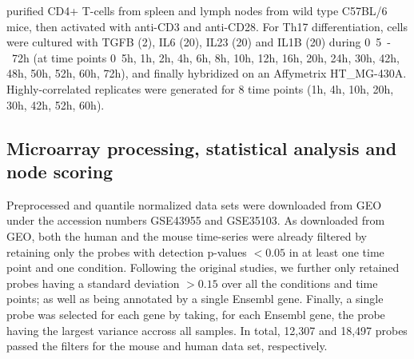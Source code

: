 \textcite{yosef2013dynamic} purified CD4+ T-cells from spleen and lymph nodes from wild type C57BL/6 mice, then activated with anti-CD3 and anti-CD28. For Th17 differentiation, cells were cultured with TGFB (\unit{2}{\nano\gram\per\milli\liter}), IL6 (\unit{20}{\nano\gram\per\milli\liter}), IL23 (\unit{20}{\nano\gram\per\milli\liter}) and IL1B (\unit{20}{\nano\gram\per\milli\liter}) during \unit{0.5-72}{h} (at time points \unit{0.5}{h}, \unit{1}{h}, \unit{2}{h}, \unit{4}{h}, \unit{6}{h}, \unit{8}{h}, \unit{10}{h}, \unit{12}{h}, \unit{16}{h}, \unit{20}{h}, \unit{24}{h}, \unit{30}{h}, \unit{42}{h}, \unit{48}{h}, \unit{50}{h}, \unit{52}{h}, \unit{60}{h}, \unit{72}{h}), and finally hybridized on an Affymetrix HT\_MG-430A.
Highly-correlated replicates were generated for 8 time points (\unit{1}{h}, \unit{4}{h}, \unit{10}{h}, \unit{20}{h}, \unit{30}{h}, \unit{42}{h}, \unit{52}{h}, \unit{60}{h}).


\subsection{Microarray processing, statistical analysis and node scoring}
\label{sub:statistical_analysis_and_node_scoring}



Preprocessed and quantile normalized data sets were downloaded from GEO under the accession numbers GSE43955 and GSE35103.
As downloaded from GEO, both the human and the mouse time-series were already filtered by retaining only the probes with detection p-values $< 0.05$ in at least one time point and one condition.
Following the original studies, we further only retained probes having a standard deviation $> 0.15$ over all the conditions and time points; as well as being annotated by a single Ensembl gene.
Finally, a single probe was selected for each gene by taking, for each Ensembl gene, the probe having the largest variance accross all samples.
In total, 12,307 and 18,497 probes passed the filters for the mouse and human data set, respectively.

